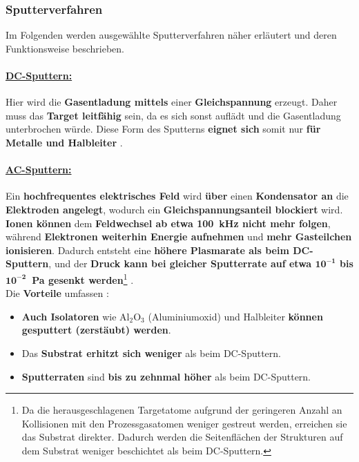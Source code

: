 \documentclass{article} %
\begin{document}
\vspace{1em}
\subsubsection{Sputterverfahren} %
Im Folgenden werden ausgewählte Sputterverfahren näher erläutert und deren Funktionsweise beschrieben.

\vspace{1em}
\paragraph{\uline{DC-Sputtern:}} Hier wird die \textbf{Gasentladung mittels} einer \textbf{Gleichspannung} erzeugt. Daher muss das \textbf{Target 
leitfähig} sein, da es sich sonst auflädt und die Gasentladung unterbrochen würde. Diese Form des Sputterns \textbf{eignet sich} somit nur 
\textbf{für Metalle und Halbleiter} \cite{keplinger2024}.

\vspace{1em}
\paragraph{\uline{AC-Sputtern:}} Ein \textbf{hochfrequentes elektrisches Feld} wird \textbf{über} einen \textbf{Kondensator an} die \textbf{Elektroden 
angelegt}, wodurch ein \textbf{Gleichspannungsanteil blockiert} wird. \textbf{Ionen können} dem \textbf{Feldwechsel ab etwa 100~kHz nicht mehr 
folgen}, während \textbf{Elektronen weiterhin Energie aufnehmen} und \textbf{mehr Gasteilchen ionisieren}. Dadurch entsteht eine \textbf{höhere 
Plasmarate als beim DC-Sputtern}, und der \textbf{Druck kann bei gleicher Sputterrate auf etwa $\mathbf{10^{-1}}$ bis $\mathbf{10^{-2}}$~Pa 
gesenkt werden}\footnote{Da die herausgeschlagenen Targetatome aufgrund der geringeren Anzahl an Kollisionen mit den Prozessgasatomen weniger 
gestreut werden, erreichen sie das Substrat direkter. Dadurch werden die Seitenflächen der Strukturen auf dem Substrat weniger beschichtet als 
beim DC-Sputtern.} \cite{keplinger2024}. \\

Die \textbf{Vorteile} umfassen \cite{keplinger2024}:

\begin{itemize}
    \item \textbf{Auch Isolatoren} wie \( \mathrm{Al}_2\mathrm{O}_3 \) (Aluminiumoxid) und Halbleiter \textbf{können gesputtert (zerstäubt) werden}.
    \item Das \textbf{Substrat erhitzt sich weniger} als beim DC-Sputtern.
    \item \textbf{Sputterraten} sind \textbf{bis zu zehnmal höher} als beim DC-Sputtern.
\end{itemize}
\end{document}
